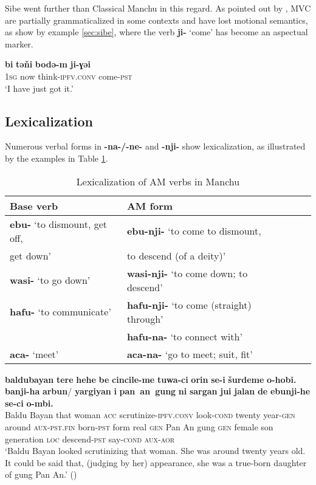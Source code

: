 \documentclass{article}
\newcommand{\ipa}[1]{\textbf{{\phon\mbox{#1}}}} %
\begin{document}
Sibe went further than Classical Manchu in this regard. As pointed out by \citet[156]{zikmundova13sibe}, MVC are partially grammaticalized in some contexts and have lost motional semantics, as show by example \ref{sec:sibe}, where the verb \ipa{ji-} `come' has become an aspectual marker.

\begin{exe}
\ex \label{sec:sibe}
\gll
\ipa{bi} 	\ipa{tǝňi} 	\ipa{bodǝ-m} 	\ipa{ji-ɣǝi} \\
\textsc{1sg} now think-\textsc{ipfv.conv} come-\textsc{pst} \\
\glt ‘I have just got it.'
\end{exe}


\subsection{Lexicalization} \label{sec:lexicalization}
Numerous verbal forms in \ipa{-na-/-ne-} and \ipa{-nji-} show lexicalization, as illustrated by the examples in Table \ref{tab:lexicalization}.

\begin{table}[h]
\caption{Lexicalization of AM verbs in Manchu} \label{tab:lexicalization} \centering
\begin{tabular}{lllll}
\toprule
Base verb & AM form  \\
\midrule
\ipa{ebu-} ‘to dismount, get off,  & \ipa{ebu-nji-} ‘to come to dismount, \\
get down’& to descend (of a deity)’\\
 \ipa{wasi-} ‘to go down’ & \ipa{wasi-nji-} ‘to come down; to descend’\\
 \ipa{hafu-} ‘to communicate’ & \ipa{hafu-nji-} ‘to come (straight) through’ \\
 & \ipa{hafu-na-} ‘to connect with’\\
 \ipa{aca-} `meet' &  \ipa{aca-na-} `go to meet; suit, fit' \\
 \bottomrule
\end{tabular}
\end{table}



\begin{exe}
\ex 
\gll \ipa{baldubayan} 	\ipa{tere} 	\ipa{hehe} 	\ipa{be} 	\ipa{cincile-me} 	\ipa{tuwa-ci} 	\ipa{orin} 	\ipa{se-i} 	\ipa{šurdeme} 	\ipa{o-hobi.} 	\ipa{banji-ha} 	\ipa{arbun}/ 	\ipa{yargiyan} 	\ipa{i} 	\ipa{pan an gung} 	\ipa{ni} 	\ipa{sargan} 	\ipa{jui} 	\ipa{jalan} 	\ipa{de} 	\ipa{ebunji-he} 	\ipa{se-ci} 	\ipa{o-mbi.} \\
{Baldu Bayan} that woman \textsc{acc} scrutinize-\textsc{ipfv.conv} look-\textsc{cond} twenty year-\textsc{gen} around \textsc{aux-pst.fin}  born-\textsc{pst} form real \textsc{gen} {Pan An gung} \textsc{gen} female son generation \textsc{loc} descend-\textsc{pst} say-\textsc{cond} \textsc{aux-aor} \\
\glt `Baldu Bayan looked scrutinizing that woman. She was around twenty years old. It could be said that, (judging by her) appearance, she was a true-born daughter of gung Pan An.' (\citealt[71,6a-6b/100]{jaxontov93nisan})
\end{exe}
\end{document}
